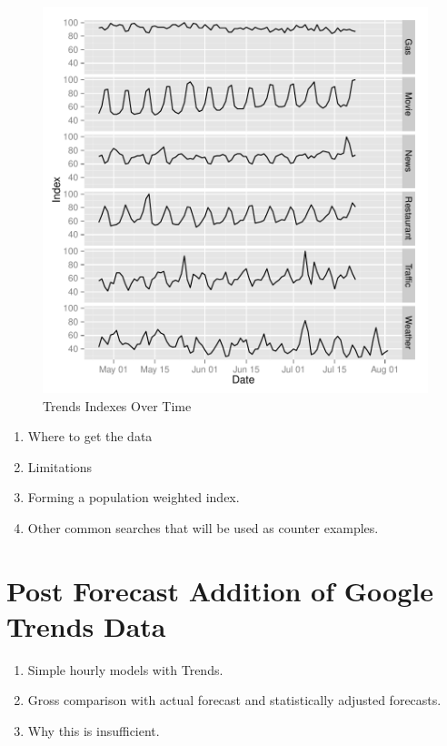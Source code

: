\documentclass{article}
\begin{document}
\begin{figure}
\begin{center}
\caption{Trends Indexes Over Time}
\includegraphics{DraftPaper-006}
\end{center}
\end{figure}



    \begin{enumerate}
      \item Where to get the data
      \item Limitations
      \item Forming a population weighted index.
      \item Other common searches that will be used as counter examples.
    \end{enumerate}

\section{Post Forecast Addition of Google Trends Data}

  \begin{enumerate}
    \item Simple hourly models with Trends.
    \item Gross comparison with actual forecast and statistically adjusted forecasts.
    \item Why this is insufficient.
  \end{enumerate}
\end{document}
